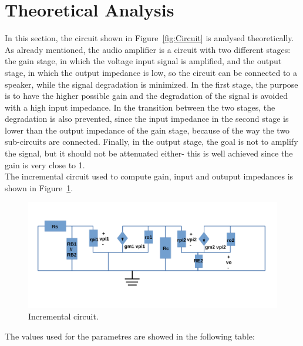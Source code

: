 \newpage
\section{Theoretical Analysis}
\label{sec:analysis}
In this section, the circuit shown in Figure~\ref{fig:Circuit} is analysed
theoretically. \\
\noindent As already mentioned, the audio amplifier is a circuit with two different stages: the gain stage, in which the voltage input signal is amplified, and the output stage, in which the output impedance is low, so the circuit can be connected to a speaker, while the signal degradation is minimized. In the first stage, the purpose is to have the higher possible gain and the degradation of the signal is avoided with a high input impedance. In the transition between the two stages, the degradation is also prevented, since the input impedance in the second stage is lower than the output impedance of the gain stage, because of the way the two sub-circuits are connected. Finally, in the output stage, the goal is not to amplify the signal, but it should not be attenuated either- this is well achieved since the gain is very close to 1.\\ 
\noindent The incremental circuit used to compute gain, input and outuput impedances is shown in Figure~\ref{fig:Incremental}.

\begin{figure}[h!] \centering
\includegraphics[width=0.8\linewidth]{Incremental.pdf}
\caption{Incremental circuit.}
\label{fig:Incremental}
\end{figure}

The values used for the parametres are showed in the following table:

